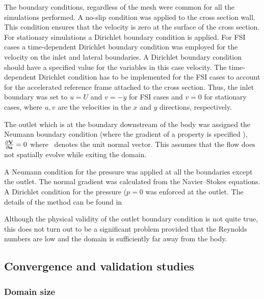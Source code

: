 The boundary conditions, regardless of the mesh  were common for all the simulations performed. A no-slip condition was applied to the cross section wall. This condition ensures that the velocity is zero at the surface of the cross section. For stationary simulations a Dirichlet boundary condition is applied. For FSI cases a time-dependent Dirichlet boundary condition was employed for the velocity on the inlet and lateral boundaries. A Dirichlet boundary condition should have a specified value for the variables \citep{kreyszig2010} in this case velocity. The time-dependent Dirichlet condition has to be implemented for the FSI cases to account for the accelerated reference frame attached to the cross section. Thus, the inlet boundary was set to $u=U$ and $v=-\dot{y}$ for FSI cases and $v=0$ for stationary cases, where $u,v$ are the velocities in the $x$ and $y$ directions, respectively.


The outlet which is at the boundary downstream of the body was assigned the Neumann boundary condition (where the gradient of a property is specified \citet{tu2007}), $\frac{\partial\mathbf{V}}{\partial\mathbf{n}}=0$ where \normal\ denotes the unit normal vector. This assumes that the flow does not spatially evolve while exiting the domain.




A Neumann condition for the pressure was applied at all the boundaries except the outlet. The normal gradient was calculated from the Navier--Stokes equations. A Dirichlet condition for the pressure ($p=0$ was enforced at the outlet. The details of the method can be found in \citet{Thompson2006,Thompson1996a}

 Although the physical validity of the outlet boundary condition is not quite true, this does not turn out to be a significant problem provided that the Reynolds numbers are low and the domain is sufficiently far away from the body.



 
 
 
 
 
 
\subsection{Convergence and validation studies}

\subsubsection{Domain size}

